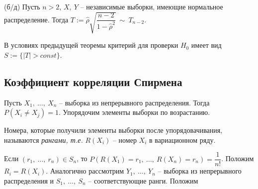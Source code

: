 \begin{theorem}
    (б/д) Пусть $\displaystyle n >2$, $\displaystyle X,\ Y$ -- независимые выборки, имеющие нормальное распределение. Тогда $\displaystyle T:=\hat{\rho }\sqrt{\dfrac{n-2}{1-\hat{\rho }^{2}}} \ \sim \ T_{n-2}$.
\end{theorem}
В условиях предыдущей теоремы критерий для проверки $\displaystyle H_{0}$ имеет вид $\displaystyle S:=\{| T|  >const\}$.
\subsection{Коэффициент корреляции Спирмена}

Пусть $\displaystyle X_{1} ,\ \dotsc ,\ X_{n}$ -- выборка из непрерывного распределения. Тогда $\displaystyle P( X_{i} \neq X_{j}) =1$. Упорядочим элементы выборки по возрастанию.
\begin{definition}
    Номера, которые получили элементы выборки после упорядовачивания, называются \textit{рангами}\textit{, т.е. }$\displaystyle R( X_{i})$ -- номер $\displaystyle X_{i}$ в вариационном ряду.
\end{definition}
Если $\displaystyle \left( r_{1} ,\ \dotsc ,\ r_{n}\right) \in S_{n}$, то $\displaystyle P( R( X_{1}) =r_{1} ,\ \dotsc ,\ R( X_{n}) =r_{n}) =\dfrac{1}{n!}$. Положим $\displaystyle R_{i} =R\left( X_{i}\right)$. Аналогично рассмотрим $\displaystyle Y_{1} ,\ \dotsc ,\ Y_{n}$ -- выборка из непрерывного распределения и $\displaystyle S_{1} ,\ \dotsc ,\ S_{n}$ -- соответствующие ранги. Положим


